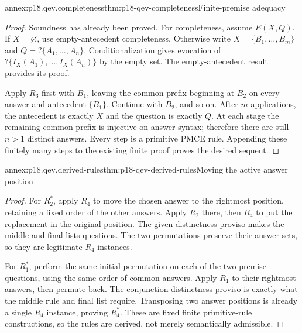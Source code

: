\begin{annexitem}{annex:p18.qev.completeness}{thm:p18-qev-completeness}{Finite-premise adequacy}
\begin{proof}
Soundness has already been proved. For completeness, assume \(E(X,Q)\).
If \(X=\varnothing\), use empty-antecedent completeness. Otherwise
write \(X=\{B_1,\ldots,B_m\}\) and
\(Q=?\{A_1,\ldots,A_n\}\). Conditionalization gives evocation
of \(?\{I_X(A_1),\ldots,I_X(A_n)\}\) by the empty set. The
empty-antecedent result provides its proof.

Apply \(R_3\) first with \(B_1\), leaving the common prefix
beginning at \(B_2\) on every answer and antecedent \(\{B_1\}\).
Continue with \(B_2\), and so on. After \(m\) applications,
the antecedent is exactly \(X\) and the question is exactly \(Q\).
At each stage the remaining common prefix is injective on answer
syntax; therefore there are still \(n>1\) distinct answers.
Every step is a primitive PMCE rule. Appending these finitely many
steps to the existing finite proof proves the desired sequent.
\end{proof}
\end{annexitem}

\begin{annexitem}{annex:p18.qev.derived-rules}{thm:p18-qev-derived-rules}{Moving the active answer position}
\begin{proof}
For \(R_2^*\), apply \(R_4\) to move the chosen answer to
the rightmost position, retaining a fixed order of the other answers.
Apply \(R_2\) there, then \(R_4\) to put the replacement in
the original position. The given distinctness proviso makes the middle
and final lists questions. The two permutations preserve their answer
sets, so they are legitimate \(R_4\) instances.

For \(R_1^*\), perform the same initial permutation on each of
the two premise questions, using the same order of common answers.
Apply \(R_1\) to their rightmost answers, then permute back.
The conjunction-distinctness proviso is exactly what the middle rule
and final list require. Transposing two answer positions is already
a single \(R_4\) instance, proving \(R_4^*\). These are fixed
finite primitive-rule constructions, so the rules are derived, not
merely semantically admissible.
\end{proof}
\end{annexitem}

